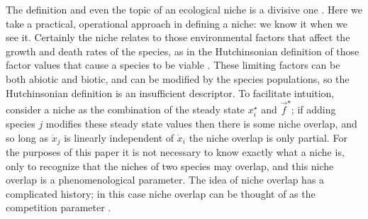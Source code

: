 \documentclass[a4paper,10pt]{article}
\numberwithin{equation}{section} %
\begin{document}
The definition and even the topic of an ecological niche is a divisive one \cite{Leibold1995}. 
Here we take a practical, operational approach in defining a niche: we know it when we see it. %
Certainly the niche relates to those environmental factors that affect the growth and death rates of the species, as in the Hutchinsonian definition of those factor values that cause a species to be viable \cite{Leibold1995,Hutchinson1957}. 
These limiting factors can be both abiotic and biotic, and can be modified by the species populations, so the Hutchinsonian definition is an insufficient descriptor\cite{Leibold1995,Chesson2000}. 
To facilitate intuition, consider a niche as the combination of the steady state $x_i^\star$ and $\vec{f}^\star$; if adding species $j$ modifies these steady state values then there is some niche overlap, and so long as $\dot{x}_j$ is linearly independent of $\dot{x}_i$ the niche overlap is only partial. 
For the purposes of this paper it is not necessary to know exactly what a niche is, only to recognize that the niches of two species may overlap, and this niche overlap is a phenomenological parameter. 
The idea of niche overlap has a complicated history; in this case niche overlap can be thought of as the competition parameter \cite{Pianka1973}. 
\end{document}
